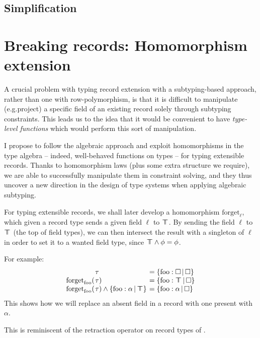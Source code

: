 \subsection{Simplification}
\label{subsec:simplification}

\section{Breaking records: Homomorphism extension}
\label{sec:morphisms}

{\color{red}
A crucial problem with typing record extension with a subtyping-based approach, rather than one with row-polymorphism, is that it is difficult to manipulate (e.g.\@ project) a specific field of an existing record solely through subtyping constraints. 
This leads us to the idea that it would be convenient to have \emph{type-level functions} which would perform this sort of manipulation. 
}

I propose to follow the algebraic approach and exploit homomorphisms in the type algebra -- indeed, well-behaved functions on types -- for typing extensible records. Thanks to homomorphism laws (plus some extra structure we require), we are able to successfully manipulate them in constraint solving, and they thus uncover a new direction in the design of type systems when applying algebraic subtyping.


\begin{example}
    For typing extensible records, we shall later develop a homomorphism $\mathrm{forget}_\ell$, which given a record type sends a given field $\ell$ to $\top \!\!\!\! \top$.
    By sending the field $\ell$ to $\top \!\!\!\! \top$ (the top of field types), we can then intersect the result with a singleton of $\ell$ in order to set it to a wanted field type, since $\top \!\!\!\! \top \land \phi = \phi$. 
    
    For example:
    \setlength{\tabcolsep}{0pt}
    $$\begin{array}{rll}
        &\hspace{-0.9em}\tau &\;\hspace{-0.9em}= \flext{\mathrm{foo}: \flabsent}{\flabsent} \\
        \mathrm{forget}_\mathrm{foo}( &\hspace{-0.9em}\tau ) &\;\hspace{-0.9em}= \flext{\mathrm{foo}: \flftop}{\flabsent} \\
        \mathrm{forget}_\mathrm{foo}( &\hspace{-0.9em}\tau ) \meet \flext{\mathrm{foo}: \alpha}{\flftop} &\;\hspace{-0.9em}= \flext{\mathrm{foo}: \alpha}{\flabsent}
    \end{array}$$
    This shows how we will replace an absent field in a record with one present with $\alpha$.

    This is reminiscent of the retraction operator on record types of \textcite{operations-on-records}.
\end{example}


